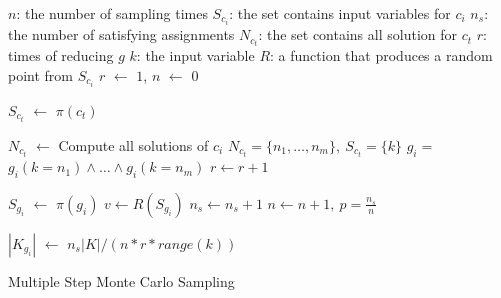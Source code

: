 \IncMargin{1em}
\begin{algorithm}\small
    \SetAlgoLined
    \DontPrintSemicolon


    $n$: the number of sampling times \;
    $S_{c_i}$: the set contains input variables for $c_{i}$ \;
    $n_{s}$: the number of satisfying assignments \;
    $N_{c_t}$: the set contains all solution for $c_t$ \;
    $r$: times of reducing $g$\;
    $k$: the input variable \;
    $R$: a function that produces a random point from $S_{c_i}$\;
    $r$ $\leftarrow$ $1$,
    $n$ $\leftarrow$ $0$ \;
     {
    $S_{c_t}$ $\leftarrow$ $\pi(c_t)$ \;
    {
    $N_{c_t}$ $\leftarrow$ Compute all solutions of $c_i$ \;
    $N_{c_t} = \{n_1, \ldots, n_m\},\ S_{c_t} = \{k\}  $ \;
    $g_{i} = $ $g_i(k=n_1) \land \ldots \land g_i(k=n_m)$ \;
    $r \leftarrow r+1$ \;

    }
    }
     {
        $S_{g_i}$ $\leftarrow$ $\pi(g_i)$ \;
        $v \leftarrow R(S_{g_i})$
        {
            $n_s \leftarrow n_s + 1$
        }
        $n \leftarrow n +1,\ p = \frac{n_s}{n}$
    }

    $|K_{g_{i}}|$ $\leftarrow$ $n_s|K| / (n * r * range(k))$
    \caption{Multiple Step Monte Carlo Sampling}
\end{algorithm}
\DecMargin{1em}



